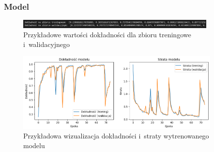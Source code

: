 \begin{frame}
    \frametitle{Model}

    \begin{figure}[ht]
        \centering
        \includegraphics[width=10cm]{../thesis/resources/model/images/scr-standard-result.png}
        \caption{Przykładowe wartości dokładności dla zbioru treningowe i~walidacyjnego}
    \end{figure}
    
    \begin{figure}[ht]
        \centering
        \includegraphics[height=4cm]{../thesis/resources/model/images/v2_epoch75.png}
        \caption{Przykładowa wizualizacja dokładności i~straty wytrenowanego modelu}
    \end{figure}

\end{frame}